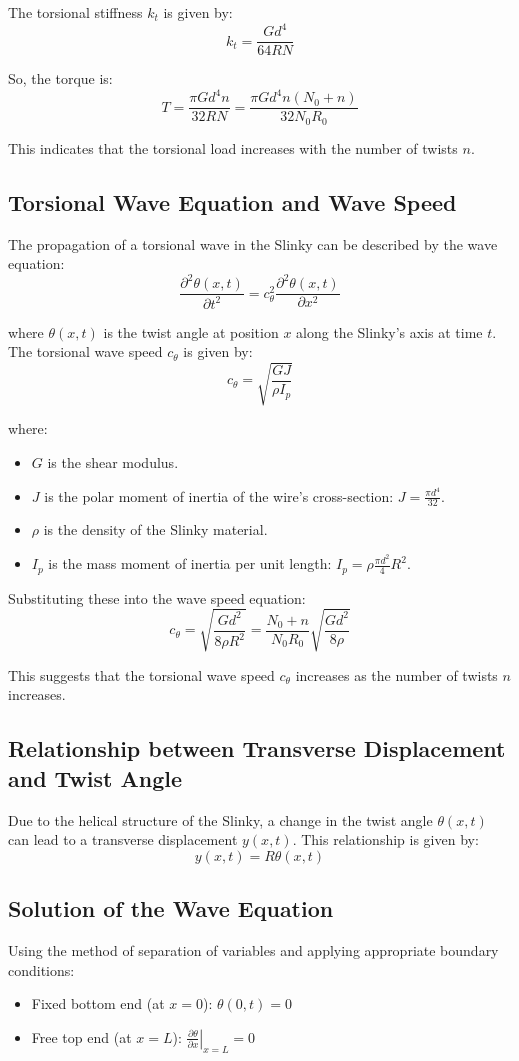 \documentclass{mcmthesis}  %
\begin{document}
The torsional stiffness \(k_t\) is given by:
\[ k_t = \frac{G d^4}{64 R N} \]

So, the torque is:
\[ T = \frac{\pi G d^4 n}{32 R N} = \frac{\pi G d^4 n (N_0+n)}{32 N_0 R_0} \]

This indicates that the torsional load increases with the number of twists \(n\).

\subsection{Torsional Wave Equation and Wave Speed}
The propagation of a torsional wave in the Slinky can be described by the wave equation:
\[ \frac{\partial^2 \theta(x,t)}{\partial t^2} = c_{\theta}^2 \frac{\partial^2 \theta(x,t)}{\partial x^2} \]

where \(\theta(x,t)\) is the twist angle at position \(x\) along the Slinky's axis at time \(t\).
The torsional wave speed \(c_{\theta}\) is given by:
\[ c_{\theta} = \sqrt{\frac{GJ}{\rho I_p}} \]

where:
\begin{itemize}
    \item \(G\) is the shear modulus.
    \item \(J\) is the polar moment of inertia of the wire's cross-section: \(J = \frac{\pi d^4}{32}\).
    \item \(\rho\) is the density of the Slinky material.
    \item \(I_p\) is the mass moment of inertia per unit length: \(I_p = \rho \frac{\pi d^2}{4} R^2\).
\end{itemize}

Substituting these into the wave speed equation:
\[ c_{\theta} = \sqrt{\frac{G d^2}{8 \rho R^2}} = \frac{N_0+n}{N_0 R_0} \sqrt{\frac{G d^2}{8 \rho}} \]

This suggests that the torsional wave speed \(c_{\theta}\) increases as the number of twists \(n\) increases.

\subsection{Relationship between Transverse Displacement and Twist Angle}
Due to the helical structure of the Slinky, a change in the twist angle \(\theta(x,t)\) can lead to a transverse displacement \(y(x,t)\). This relationship is given by:
\[ y(x,t) = R \theta(x,t) \]

\subsection{Solution of the Wave Equation}
Using the method of separation of variables and applying appropriate boundary conditions:
\begin{itemize}
    \item Fixed bottom end (at \(x=0\)): \(\theta(0,t) = 0\)
    \item Free top end (at \(x=L\)): \(\left. \frac{\partial \theta}{\partial x} \right|_{x=L} = 0\)
\end{itemize}
\end{document}
